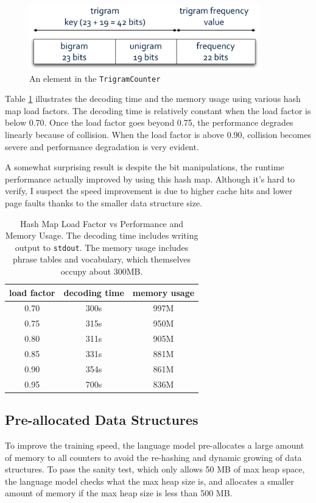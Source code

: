 \documentclass[12pt]{article}   %
\begin{document}
\begin{figure}[h*]
	\centering
	\includegraphics[width=10cm]{trigram_map.pdf}
	\caption{An element in the \texttt{TrigramCounter}}
	\label{fig:trigramcounter}
\end{figure}

Table \ref{tbl:perf} illustrates the decoding time and the memory usage using various hash map load factors. The decoding time is relatively constant when the load factor is below 0.70. Once the load factor goes beyond 0.75, the performance degrades linearly because of collision. When the load factor is above 0.90, collision becomes severe and performance degradation is very evident.

A somewhat surprising result is despite the bit manipulations, the runtime performance actually improved by using this hash map. Although it’s hard to verify, I suspect the speed improvement is due to higher cache hits and lower page faults thanks to the smaller data structure size.

\begin{table}
\label{tbl:perf}
\centering
\begin{tabular}{ c | c | c  }
	load factor & decoding time & memory usage \\
	\hline
	0.70 & 300s & 997M \\
	0.75 & 315s & 950M \\
	0.80 & 311s & 905M \\
	0.85 & 331s & 881M \\
	0.90 & 354s & 861M \\
	0.95 & 700s & 836M \\
\end{tabular}
\caption{Hash Map Load Factor vs Performance and Memory Usage. The decoding time includes writing output to \texttt{stdout}. The memory usage includes phrase tables and vocabulary, which themselves occupy about 300MB.}
\end{table}


\subsection{Pre-allocated Data Structures}
To improve the training speed, the language model pre-allocates a large amount of memory to all counters to avoid the re-hashing and dynamic growing of data structures. To pass the sanity test, which only allows 50 MB of max heap space, the language model checks what the max heap size is, and allocates a smaller amount of memory if the max heap size is less than 500 MB.
\end{document}
